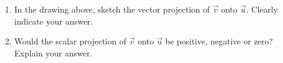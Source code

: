 \documentclass[11pt]{article}
\theoremstyle{remark}
\begin{document}
\begin{enumerate}
\begin{enumerate}
\item In the drawing above, sketch the vector projection of $\vec{v}$ onto $\vec{u}.$  Clearly indicate your answer.\\

\item Would the scalar projection of $\vec{v}$ onto $\vec{u}$  be positive, negative or zero? Explain your answer.\\
\end{enumerate}
\end{enumerate}
\end{document}
